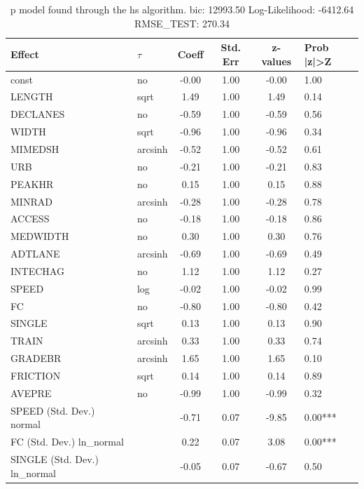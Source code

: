 \begin{table}
	\caption{p model found through the hs algorithm. bic: 12993.50 Log-Likelihood: -6412.64 RMSE_TEST: 270.34}
	\begin{center}
		\begin{tabular}{|l|l|c|c|c|l|}
			\hline
			Effect & $\tau$ & Coeff & Std. Err & z-values & Prob |z|>Z \\
			\hline
			const & no & -0.00 & 1.00 & -0.00 & 1.00 \\
			\hline
			LENGTH & sqrt & 1.49 & 1.00 & 1.49 & 0.14 \\
			\hline
			DECLANES & no & -0.59 & 1.00 & -0.59 & 0.56 \\
			\hline
			WIDTH & sqrt & -0.96 & 1.00 & -0.96 & 0.34 \\
			\hline
			MIMEDSH & arcsinh & -0.52 & 1.00 & -0.52 & 0.61 \\
			\hline
			URB & no & -0.21 & 1.00 & -0.21 & 0.83 \\
			\hline
			PEAKHR & no & 0.15 & 1.00 & 0.15 & 0.88 \\
			\hline
			MINRAD & arcsinh & -0.28 & 1.00 & -0.28 & 0.78 \\
			\hline
			ACCESS & no & -0.18 & 1.00 & -0.18 & 0.86 \\
			\hline
			MEDWIDTH & no & 0.30 & 1.00 & 0.30 & 0.76 \\
			\hline
			ADTLANE & arcsinh & -0.69 & 1.00 & -0.69 & 0.49 \\
			\hline
			INTECHAG & no & 1.12 & 1.00 & 1.12 & 0.27 \\
			\hline
			SPEED & log & -0.02 & 1.00 & -0.02 & 0.99 \\
			\hline
			FC & no & -0.80 & 1.00 & -0.80 & 0.42 \\
			\hline
			SINGLE & sqrt & 0.13 & 1.00 & 0.13 & 0.90 \\
			\hline
			TRAIN & arcsinh & 0.33 & 1.00 & 0.33 & 0.74 \\
			\hline
			GRADEBR & arcsinh & 1.65 & 1.00 & 1.65 & 0.10 \\
			\hline
			FRICTION & sqrt & 0.14 & 1.00 & 0.14 & 0.89 \\
			\hline
			AVEPRE & no & -0.99 & 1.00 & -0.99 & 0.32 \\
			\hline
			SPEED (Std. Dev.) normal &  & -0.71 & 0.07 & -9.85 & 0.00*** \\
			\hline
			FC (Std. Dev.) ln_normal &  & 0.22 & 0.07 & 3.08 & 0.00*** \\
			\hline
			SINGLE (Std. Dev.) ln_normal &  & -0.05 & 0.07 & -0.67 & 0.50 \\

\end{tabular}
\end{center}
\end{table}
